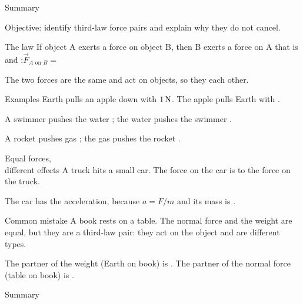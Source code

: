 \begin{nrow}{Summary}
\else\vspace{2.2cm}\fi
\end{nrow}

\begin{center}\textsf{\small\color{apgrey}Objective: identify third-law force pairs and explain why they do not cancel.}\end{center}
\begin{nrow}{The law}
If object A exerts a force on object B, then B exerts a force on A that is  and :\quad $\vec F_{A\text{ on }B}=$ \par\smallskip
The two forces are the same  and act on  objects, so they  each other.
\end{nrow}
\begin{nrow}{Examples}
Earth pulls an apple down with $1\N$. The apple pulls Earth  with \fillin{$1\N$}.\par
A swimmer pushes the water ; the water pushes the swimmer .\par
A rocket pushes gas ; the gas pushes the rocket .
\end{nrow}
\begin{nrow}{Equal forces,\\ different effects}
A truck hits a small car. The force on the car is  to the force on the truck.\par
The car has the  acceleration, because $a=F/m$ and its mass is .
\end{nrow}
\begin{nrow}{Common mistake}
A book rests on a table. The normal force and the weight are equal, but they are  a third-law pair: they act on the  object and are different types.\par
The partner of the weight (Earth on book) is . The partner of the normal force (table on book) is .
\end{nrow}
\begin{nrow}{Summary}
\else\vspace{2.2cm}\fi
\end{nrow}

